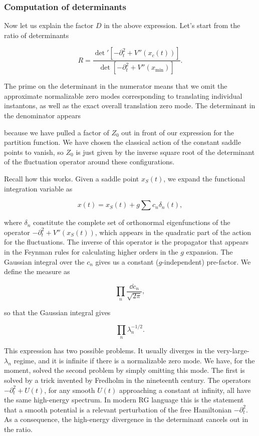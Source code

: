 \subsubsection{Computation of determinants}

Now let us explain the factor $D$ in the above expression. Let's start from the
ratio of determinants

\[
  R=\frac{\det'[-\partial_t^2+V''(x_c(t))]}
  {\det[-\partial_t^2+V''(x_{\min})]}.
\]

The prime on the determinant in the numerator means that we omit the
approximate normalizable zero modes corresponding to translating individual
instantons, as well as the exact overall translation zero mode. The determinant
in the denominator appears

because we have pulled a factor of $Z_0$ out in front of our expression for the
partition function. We have chosen the classical action of the constant saddle
points to vanish, so $Z_0$ is just given by the inverse square root of the
determinant of the fluctuation operator around these configurations.

Recall how this works. Given a saddle point $x_S(t)$, we expand the functional
integration variable as

\[
  x(t)=x_S(t)+g\sum c_n\delta_n(t),
\]

where $\delta_n$ constitute the complete set of orthonormal eigenfunctions of
the operator $-\partial_t^2+V''(x_S(t))$, which appears in the quadratic part
of the action for the fluctuations. The inverse of this operator is the
propagator that appears in the Feynman rules for calculating higher orders in
the $g$ expansion. The Gaussian integral over the $c_n$ gives us a constant
($g$-independent) pre-factor. We define the measure as

\[
  \prod_n\frac{\dd c_n}{\sqrt{2\pi}},
\]

so that the Gaussian integral gives

\[
  \prod_n\lambda_n^{-1/2}.
\]

This expression has two possible problems. It usually diverges in the
very-large-$\lambda_n$ regime, and it is infinite if there is a normalizable zero
mode. We have, for the moment, solved the second problem by simply omitting this
mode. The first is solved by a trick invented by Fredholm in the nineteenth
century. The operators $-\partial_t^2+U(t)$, for any smooth $U(t)$ approaching a
constant at infinity, all have the same high-energy spectrum. In modern RG
language this is the statement that a smooth potential is a relevant
perturbation of the free Hamiltonian $-\partial_t^2$. As a consequence, the
high-energy divergence in the determinant cancels out in the ratio.


